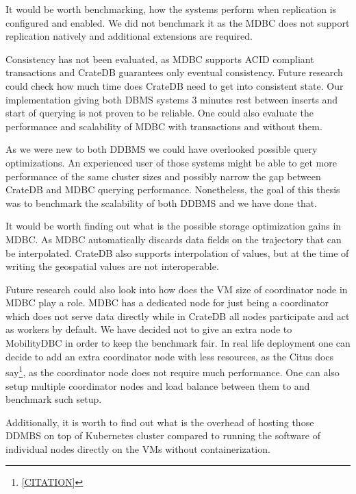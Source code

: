 It would be worth benchmarking, how the systems perform when replication is configured and enabled.
We did not benchmark it as the MDBC does not support replication natively and additional extensions are required.

Consistency has not been evaluated, as MDBC supports ACID compliant transactions and CrateDB guarantees only eventual consistency.
Future research could check how much time does CrateDB need to get into consistent state.
Our implementation giving both DBMS systems 3 minutes rest between inserts and start of querying is not proven to be reliable.
One could also evaluate the performance and scalability of MDBC with transactions and without them.

As we were new to both DDBMS we could have overlooked possible query optimizations.
An experienced user of those systems might be able to get more performance of the same cluster sizes and possibly narrow the gap between CrateDB and MDBC querying performance.
Nonetheless, the goal of this thesis was to benchmark the scalability of both DDBMS and we have done that.

It would be worth finding out what is the possible storage optimization gains in MDBC.
As MDBC automatically discards data fields on the trajectory that can be interpolated.
CrateDB also supports interpolation of values, but at the time of writing the geospatial values are not interoperable.

Future research could also look into how does the VM size of coordinator node in MDBC play a role.
MDBC has a dedicated node for just being a coordinator which does not serve data directly while in CrateDB all nodes participate and act as workers by default.
We have decided not to give an extra node to MobilityDBC in order to keep the benchmark fair.
In real life deployment one can decide to add an extra coordinator node with less resources, as the Citus docs say\footnote{\url{[CITATION]}}, as the coordinator node does not require much performance.
One can also setup multiple coordinator nodes and load balance between them to and benchmark such setup.

Additionally, it is worth to find out what is the overhead of hosting those DDMBS on top of Kubernetes cluster compared to running the software of individual nodes directly on the VMs without containerization.

